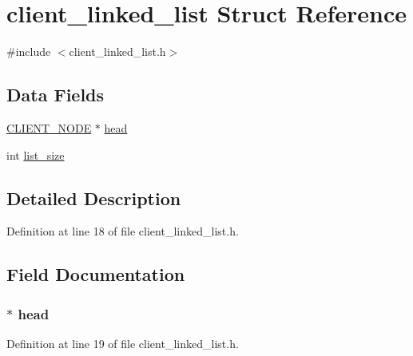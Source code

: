 \hypertarget{structclient__linked__list}{}\section{client\+\_\+linked\+\_\+list Struct Reference}
\label{structclient__linked__list}


{\ttfamily \#include $<$client\+\_\+linked\+\_\+list.\+h$>$}

\subsection*{Data Fields}
\begin{DoxyCompactItemize}
\item 
\hyperlink{client__node_8h_aa942063b3975bfdbcdda012fbc612a9b}{C\+L\+I\+E\+N\+T\+\_\+\+N\+O\+D\+E} $\ast$ \hyperlink{structclient__linked__list_ae8dbd64361b5d67bbfa709e0d85b56a0}{head}
\item 
int \hyperlink{structclient__linked__list_a51695a823cbcb573d6cf50043a5adb1a}{list\+\_\+size}
\end{DoxyCompactItemize}


\subsection{Detailed Description}


Definition at line 18 of file client\+\_\+linked\+\_\+list.\+h.



\subsection{Field Documentation}
\hypertarget{structclient__linked__list_ae8dbd64361b5d67bbfa709e0d85b56a0}{}
\subsubsection[{head}]{$\ast$ head}\label{structclient__linked__list_ae8dbd64361b5d67bbfa709e0d85b56a0}


Definition at line 19 of file client\+\_\+linked\+\_\+list.\+h.

\hypertarget{structclient__linked__list_a51695a823cbcb573d6cf50043a5adb1a}{}
